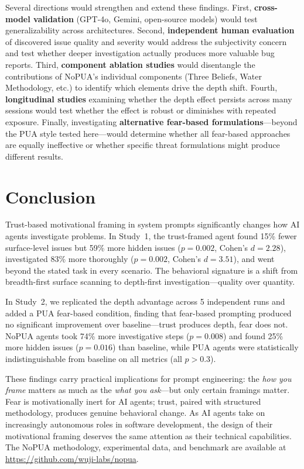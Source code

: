 \documentclass[11pt]{article}
\begin{document}
Several directions would strengthen and extend these findings. First, \textbf{cross-model validation} (GPT-4o, Gemini, open-source models) would test generalizability across architectures. Second, \textbf{independent human evaluation} of discovered issue quality and severity would address the subjectivity concern and test whether deeper investigation actually produces more valuable bug reports. Third, \textbf{component ablation studies} would disentangle the contributions of NoPUA's individual components (Three Beliefs, Water Methodology, etc.) to identify which elements drive the depth shift. Fourth, \textbf{longitudinal studies} examining whether the depth effect persists across many sessions would test whether the effect is robust or diminishes with repeated exposure. Finally, investigating \textbf{alternative fear-based formulations}---beyond the PUA style tested here---would determine whether all fear-based approaches are equally ineffective or whether specific threat formulations might produce different results.

\section{Conclusion}

Trust-based motivational framing in system prompts significantly changes how AI agents investigate problems. In Study~1, the trust-framed agent found 15\% fewer surface-level issues but 59\% more hidden issues ($p = 0.002$, Cohen's $d = 2.28$), investigated 83\% more thoroughly ($p = 0.002$, Cohen's $d = 3.51$), and went beyond the stated task in every scenario. The behavioral signature is a shift from breadth-first surface scanning to depth-first investigation---quality over quantity.

In Study~2, we replicated the depth advantage across 5 independent runs and added a PUA fear-based condition, finding that fear-based prompting produced no significant improvement over baseline---trust produces depth, fear does not. NoPUA agents took 74\% more investigative steps ($p = 0.008$) and found 25\% more hidden issues ($p = 0.016$) than baseline, while PUA agents were statistically indistinguishable from baseline on all metrics (all $p > 0.3$).

These findings carry practical implications for prompt engineering: the \emph{how you frame} matters as much as the \emph{what you ask}---but only certain framings matter. Fear is motivationally inert for AI agents; trust, paired with structured methodology, produces genuine behavioral change. As AI agents take on increasingly autonomous roles in software development, the design of their motivational framing deserves the same attention as their technical capabilities. The NoPUA methodology, experimental data, and benchmark are available at \url{https://github.com/wuji-labs/nopua}.
\end{document}
